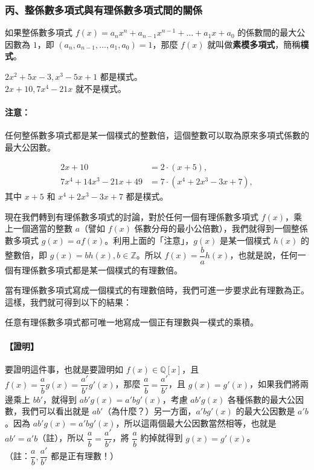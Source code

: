 \subsubsection*{丙、整係數多項式與有理係數多項式間的關係}\label{subsec:7-2-c}

\begin{definition*}
如果整係數多項式 $f(x) = a_n x^n + a_{n-1} x^{n-1} + \dots + a_1 x + a_0$ 的係數間的最大公因數為 $1$，即 $(a_n, a_{n-1}, \dots, a_1, a_0) = 1$，那麼 $f(x)$ 就叫做\textbf{素模多項式}，簡稱\textbf{樸式}。
\end{definition*}

\begin{example}\label{ex:7-2-10}
$2x^2+5x-3, x^3-5x+1$ 都是樸式。\\
$2x+10, 7x^4-21x$ 就不是樸式。
\end{example}

\paragraph{注意：}
任何整係數多項式都是某一個樸式的整數倍，這個整數可以取為原來多項式係數的最大公因數。

\begin{example}\label{ex:7-2-11}
\begin{align*}
  2x+10 &= 2 \cdot (x+5), \\
  7x^4+14x^3-21x+49 &= 7 \cdot (x^4+2x^3-3x+7),
\end{align*}
其中 $x+5$ 和 $x^4+2x^3-3x+7$ 都是樸式。
\end{example}

現在我們轉到有理係數多項式的討論，對於任何一個有理係數多項式 $f(x)$，乘上一個適當的整數 $a$（譬如 $f(x)$ 係數分母的最小公倍數），我們就得到一個整係數多項式 $g(x) = af(x)$。利用上面的「注意」，$g(x)$ 是某一個樸式 $h(x)$ 的整數倍，即 $g(x) = bh(x), b \in \mathbb{Z}$。所以 $f(x) = \dfrac{b}{a} h(x)$，也就是說，任何一個有理係數多項式都是某一個樸式的有理數倍。

當有理係數多項式寫成一個樸式的有理數倍時，我們可進一步要求此有理數為正。這樣，我們就可得到以下的結果：

\begin{prop}\label{prop:primitive_unique}
任意有理係數多項式都可唯一地寫成一個正有理數與一樸式的乘積。
\end{prop}

\paragraph{【證明】}
要證明這件事，也就是要證明如 $f(x) \in \mathbb{Q}[x]$，且 $f(x) = \dfrac{a}{b} g(x) = \dfrac{a'}{b'} g'(x)$，那麼 $\dfrac{a}{b} = \dfrac{a'}{b'}$，且 $g(x) = g'(x)$，如果我們將兩邊乘上 $bb'$，就得到 $ab' g(x) = a'b g'(x)$，考慮 $ab' g(x)$ 各種係數的最大公因數，我們可以看出就是 $ab'$（為什麼？）另一方面，$a'b g'(x)$ 的最大公因數是 $a'b$。因為 $ab' g(x) = a'b g'(x)$，所以這兩個最大公因數當然相等，也就是 $ab' = a'b$（註），所以 $\dfrac{a}{b} = \dfrac{a'}{b'}$，將 $\dfrac{a}{b}$ 約掉就得到 $g(x) = g'(x)$。\\
（註：$\dfrac{a}{b}, \dfrac{a'}{b'}$ 都是正有理數！）

